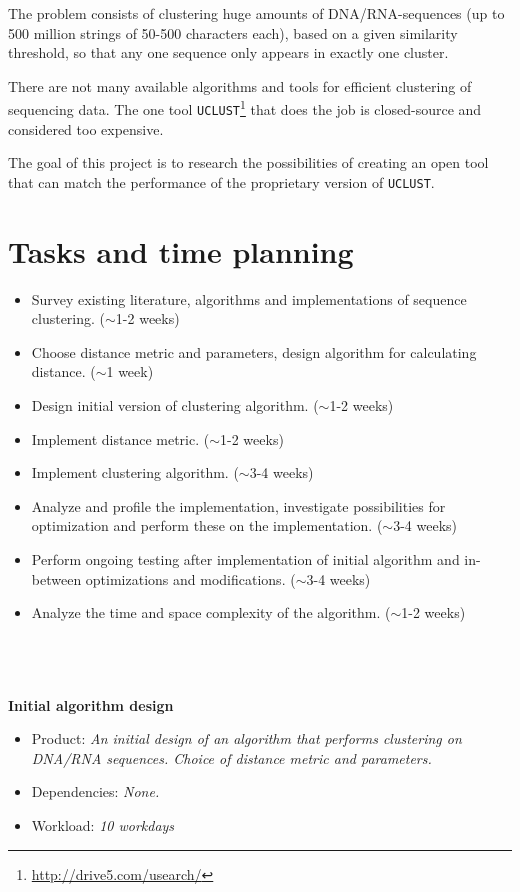 \documentclass[11pt,a4paper]{article}
\begin{document}
The problem consists of clustering huge amounts of DNA/RNA-sequences (up to 500
million strings of 50-500 characters each), based on a given similarity
threshold, so that any one sequence only appears in exactly one cluster.
 
There are not many available algorithms and tools for efficient clustering of
sequencing data. The one tool
\texttt{UCLUST}\footnote{\url{http://drive5.com/usearch/}} that does the job is
closed-source and considered too expensive. %

The goal of this project is to research the possibilities of creating an open
tool that can match the performance of the proprietary version of
\texttt{UCLUST}.


\section{Tasks and time planning}
\begin{itemize}
  \item Survey existing literature, algorithms and implementations of sequence
    clustering. ($\sim$1-2 weeks)

  \item Choose distance metric and parameters, design algorithm for calculating
    distance. ($\sim$1 week)

  \item Design initial version of clustering algorithm. ($\sim$1-2 weeks)

  \item Implement distance metric. ($\sim$1-2 weeks) %

  \item Implement clustering algorithm. ($\sim$3-4 weeks)

  \item Analyze and profile the implementation, investigate possibilities for
    optimization and perform these on the implementation. ($\sim$3-4 weeks)

  \item Perform ongoing testing after implementation of initial algorithm and
    in-between optimizations and modifications. ($\sim$3-4 weeks)

  \item Analyze the time and space complexity of the algorithm. ($\sim$1-2
    weeks)
\end{itemize}

\hfill\\
\hfill\\
\hfill\\
\textbf{Initial algorithm design}
\begin{itemize}
  \item Product: \textit{An initial design of an algorithm that performs
    clustering on DNA/RNA sequences. Choice of distance metric and parameters.}
  \item Dependencies: \textit{None.}
  \item Workload: \textit{10 workdays}
\end{itemize}
\end{document}
